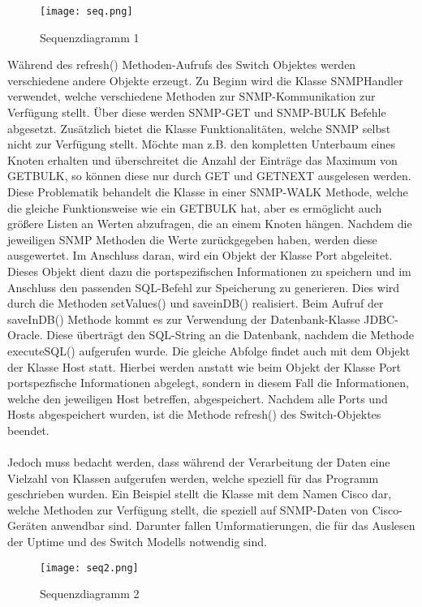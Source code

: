 \begin{figure}[H]
\centering
\texttt{[image: seq.png]}
\caption{Sequenzdiagramm 1}
\label{fig:sequecediagram1}
\end{figure}

Während des refresh() Methoden-Aufrufs des Switch Objektes werden verschiedene andere Objekte erzeugt. Zu Beginn wird die Klasse SNMPHandler verwendet, welche verschiedene Methoden zur SNMP-Kommunikation zur Verfügung stellt. Über diese werden SNMP-GET und SNMP-BULK Befehle abgesetzt. Zusätzlich bietet die Klasse Funktionalitäten, welche SNMP selbst nicht zur Verfügung stellt. Möchte man z.B. den kompletten Unterbaum eines Knoten erhalten und überschreitet die Anzahl der Einträge das Maximum von GETBULK, so können diese nur durch GET und GETNEXT ausgelesen werden. Diese Problematik behandelt die Klasse in einer SNMP-WALK Methode, welche die gleiche Funktionsweise wie ein GETBULK hat, aber es ermöglicht auch größere Listen an Werten abzufragen, die an einem Knoten hängen. Nachdem die jeweiligen SNMP Methoden die Werte zurückgegeben haben, werden diese ausgewertet. Im Anschluss daran, wird ein Objekt der Klasse Port abgeleitet.
Dieses Objekt dient dazu die portspezifischen Informationen zu speichern und im Anschluss den passenden SQL-Befehl zur Speicherung zu generieren. Dies wird durch die Methoden setValues() und saveinDB() realisiert.
Beim Aufruf der saveInDB() Methode kommt es zur Verwendung der Datenbank-Klasse JDBC-Oracle. Diese überträgt den SQL-String an die Datenbank, nachdem die Methode executeSQL() aufgerufen wurde.
Die gleiche Abfolge findet auch mit dem Objekt der Klasse Host statt. Hierbei werden anstatt wie beim Objekt der Klasse Port portspezfische Informationen abgelegt, sondern in diesem Fall die Informationen, welche den jeweiligen Host betreffen, abgespeichert.
Nachdem alle Ports und Hosts abgespeichert wurden, ist die Methode refresh() des Switch-Objektes beendet.\\\\
Jedoch muss bedacht werden, dass während der Verarbeitung der Daten eine Vielzahl von Klassen aufgerufen werden, welche speziell für das Programm geschrieben wurden.
Ein Beispiel stellt die Klasse mit dem Namen Cisco dar, welche Methoden zur Verfügung stellt, die speziell auf SNMP-Daten von Cisco-Geräten anwendbar sind.
Darunter fallen Umformatierungen, die für das Auslesen der Uptime und des Switch Modells notwendig sind.


\begin{figure}[H]
\centering
\texttt{[image: seq2.png]}
\caption{Sequenzdiagramm 2}
\label{fig:sequecediagram2}
\end{figure}

